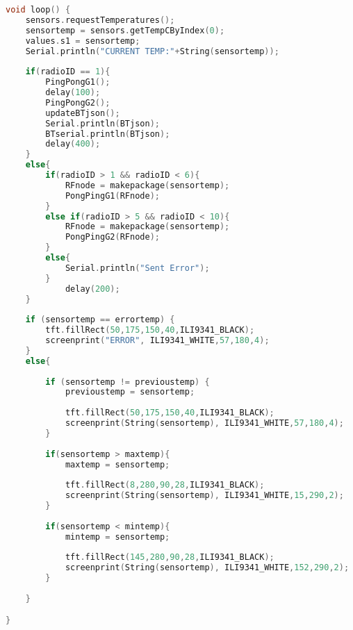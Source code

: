 \begin{lstlisting}[language=C++, caption={Firmware de nuestro prototipo en su versión 1.0}, captionpos=b, basicstyle=\small]
void loop() {
	sensors.requestTemperatures();
	sensortemp = sensors.getTempCByIndex(0);
	values.s1 = sensortemp;
	Serial.println("CURRENT TEMP:"+String(sensortemp));
	
	if(radioID == 1){
		PingPongG1();
		delay(100);
		PingPongG2();
		updateBTjson();
		Serial.println(BTjson);
		BTserial.println(BTjson);
		delay(400);
	}
	else{
		if(radioID > 1 && radioID < 6){
			RFnode = makepackage(sensortemp);
			PongPingG1(RFnode);
		}
		else if(radioID > 5 && radioID < 10){
			RFnode = makepackage(sensortemp);
			PongPingG2(RFnode);
		}
		else{
			Serial.println("Sent Error");
		}
			delay(200);
	}
	
	if (sensortemp == errortemp) {
		tft.fillRect(50,175,150,40,ILI9341_BLACK);
		screenprint("ERROR", ILI9341_WHITE,57,180,4);
	}
	else{
	
		if (sensortemp != previoustemp) {
			previoustemp = sensortemp;
			
			tft.fillRect(50,175,150,40,ILI9341_BLACK);
			screenprint(String(sensortemp), ILI9341_WHITE,57,180,4);
		}
		
		if(sensortemp > maxtemp){
			maxtemp = sensortemp;
			
			tft.fillRect(8,280,90,28,ILI9341_BLACK);
			screenprint(String(sensortemp), ILI9341_WHITE,15,290,2);
		}
		
		if(sensortemp < mintemp){
			mintemp = sensortemp;
			
			tft.fillRect(145,280,90,28,ILI9341_BLACK);
			screenprint(String(sensortemp), ILI9341_WHITE,152,290,2);
		}
	
	}

}
\end{lstlisting}

